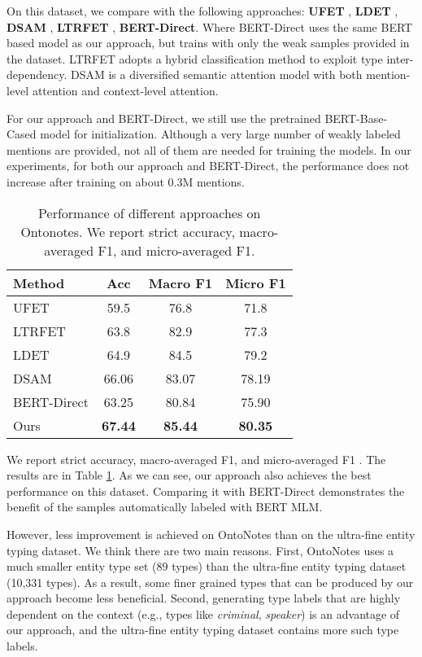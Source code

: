 \documentclass[11pt,a4paper]{article}
\begin{document}
On this dataset, we compare with the following approaches: \textbf{UFET} \cite{choi2018ultra}, \textbf{LDET} \cite{onoe2019learning}, \textbf{DSAM} \cite{hu2020diversified}, \textbf{LTRFET} \cite{lin2019attentive}, \textbf{BERT-Direct}. Where BERT-Direct uses the same BERT based model as our approach, but trains with only the weak samples provided in the dataset. 
LTRFET adopts a hybrid classification method to exploit type inter-dependency. DSAM is a diversified semantic attention model with both mention-level attention and context-level attention.

For our approach and BERT-Direct, we still use the pretrained BERT-Base-Cased model for initialization. Although a very large number of weakly labeled mentions are provided, not all of them are needed for training the models. In our experiments, for both our approach and BERT-Direct, the performance does not increase after training on about 0.3M mentions.

\begin{table}[t]
\centering
\begin{tabular}{lccc}
\hline \textbf{Method} & \textbf{Acc} & \textbf{Macro F1} & \textbf{Micro F1} \\ \hline
UFET & 59.5 & 76.8 & 71.8 \\ 
LTRFET & 63.8 & 82.9 & 77.3 \\ 
LDET & 64.9 & 84.5 & 79.2 \\ 
DSAM & 66.06 & 83.07 & 78.19 \\ \hline
BERT-Direct & 63.25 & 80.84 & 75.90 \\
Ours & \textbf{67.44} & \textbf{85.44} & \textbf{80.35} \\ \hline
\end{tabular}
\caption{\label{tab:performance-ontonotes} Performance of different approaches on Ontonotes. We report strict accuracy, macro-averaged F1, and micro-averaged F1.}
\end{table}

We report strict accuracy, macro-averaged F1, and micro-averaged F1 \cite{ling2012fine}. The results are in Table \ref{tab:performance-ontonotes}. As we can see, our approach also achieves the best performance on this dataset.
Comparing it with BERT-Direct demonstrates the benefit of the samples automatically labeled with BERT MLM.

However, less improvement is achieved on OntoNotes than on the ultra-fine entity typing dataset. We think there are two main reasons. First, OntoNotes uses a much smaller entity type set (89 types) than the ultra-fine entity typing dataset (10,331 types). As a result, some finer grained types that can be produced by our approach become less beneficial. Second, generating type labels that are highly dependent on the context (e.g., types like \textit{criminal}, \textit{speaker}) is an advantage of our approach, and the ultra-fine entity typing dataset contains more such type labels. 
\end{document}
